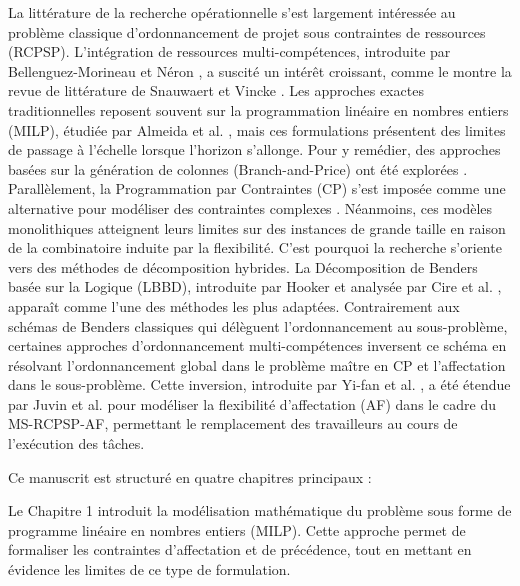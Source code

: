 \bigskip

La littérature de la recherche opérationnelle s'est largement intéressée au problème classique d'or\-donnancement de projet sous contraintes de ressources (RCPSP). L'intégration de ressources multi-compéten\-ces, introduite par Bellenguez-Morineau et Néron \cite{bellenguez2007branch, bellenguez2008multi}, a suscité un intérêt croissant, comme le montre la revue de littérature de Snauwaert et Vincke \cite{snauwaert2023classification}. Les approches exactes traditionnelles reposent souvent sur la programmation linéaire en nombres entiers (MILP), étudiée par Almeida et al. \cite{almeida2019modeling}, mais ces formulations présentent des limites de passage à l'échelle lorsque l'horizon s'allonge. Pour y remédier, des approches basées sur la génération de colonnes (Branch-and-Price) ont été explorées \cite{correia2015modeling, montoya2014branch}. Parallèlement, la Programmation par Contraintes (CP) s'est imposée comme une alternative pour modéliser des contraintes complexes \cite{young2017constraint, polo2020mixed}. Néanmoins, ces modèles monolithiques atteignent leurs limites sur des instances de grande taille en raison de la combinatoire induite par la flexibilité. C'est pourquoi la recherche s'oriente vers des méthodes de décomposition hybrides. La Décomposition de Benders basée sur la Logique (LBBD), introduite par Hooker \cite{hooker2000logic, hooker2019logic} et analysée par Cire et al. \cite{cire2016logic}, apparaît comme l'une des méthodes les plus adaptées. Contrairement aux schémas de Benders classiques qui délèguent l'ordonnancement au sous-problème, certaines approches d'ordonnancement multi-compétences inversent ce schéma en résolvant l'ordonnancement global dans le problème maître en CP et l'affectation dans le sous-problème. Cette inversion, introduite par Yi-fan et al. \cite{yi2013new}, a été étendue par Juvin et al. \cite{juvin2026logic} pour modéliser la flexibilité d'affectation (AF) dans le cadre du MS-RCPSP-AF, permettant le remplacement des travailleurs au cours de l'exécution des tâches.
\bigskip



Ce manuscrit est structuré en quatre chapitres principaux :

\bigskip
\noindent Le Chapitre 1 introduit la modélisation mathématique du problème sous forme de programme linéaire en nombres entiers (MILP). Cette approche permet de formaliser les contraintes d'affectation et de précédence, tout en mettant en évidence les limites de ce type de formulation.

